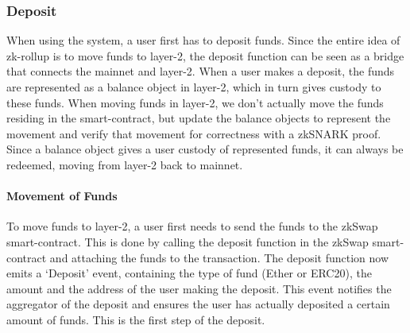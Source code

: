 \documentclass[../../thesis.tex]{subfiles}
\begin{document}
\subsubsection{Deposit}
When using the system, a user first has to deposit funds. Since the entire idea of zk-rollup is to move funds to layer-2, the deposit function can be seen as a bridge that connects the mainnet and layer-2. When a user makes a deposit, the funds are represented as a balance object in layer-2, which in turn gives custody to these funds. When moving funds in layer-2, we don't actually move the funds residing in the smart-contract, but update the balance objects to represent the movement and verify that movement for correctness with a zkSNARK proof. Since a balance object gives a user custody of represented funds, it can always be redeemed, moving from layer-2 back to mainnet.  

\paragraph{Movement of Funds}
To move funds to layer-2, a user first needs to send the funds to the zkSwap smart-contract. This is done by calling the deposit function in the zkSwap smart-contract and attaching the funds to the transaction. The deposit function now emits a `Deposit' event, containing the type of fund (Ether or ERC20), the amount and the address of the user making the deposit. This event notifies the aggregator of the deposit and ensures the user has actually deposited a certain amount of funds. This is the first step of the deposit.
\end{document}
